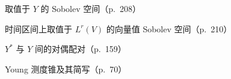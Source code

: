 \documentclass[../main.tex]{subfiles}
\begin{document}
\begin{description}[style=nextline,leftmargin=1.2em,itemsep=1pt,topsep=2pt,font=\normalfont\small]
\item[{$W^{m,p}(U;Y),\ W^{m,p}_{\mathrm{loc}}(U;Y)$}] 取值于 $Y$ 的 Sobolev 空间（p.~208）
\item[{$W^{1,p}(I;L^r(V))$}] 时间区间上取值于 $L^r(V)$ 的向量值 Sobolev 空间（p.~210）
\item[{$\langle\cdot,\cdot\rangle_{Y^*,Y}$}] $Y^*$ 与 $Y$ 间的对偶配对（p.~159）
\item[{$\mathcal{Y}_+(X,\mathcal{B}(X),\mu;Y),\ \mathcal{Y}_+(X;Y)$}] Young 测度锥及其简写（p.~70）
\end{description}
\end{document}
